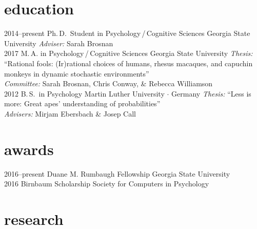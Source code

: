 \documentclass[]{friggeri-cv}
\begin{document}
\section{education}

\begin{entrylist}
  \entry
    {2014--present}
    {Ph.\,D.~Student in Psychology\,/\,Cognitive Sciences}
    {Georgia State University}
    {\emph{Adviser:} Sarah Brosnan\\[-.3cm]}
 \entry
   {2017}
   {M.\,A. in Psychology\,/\,Cognitive Sciences}
   {Georgia State University}
   {\emph{Thesis:} ``Rational fools: (Ir)rational choices of humans, rhesus macaques, and capuchin monkeys in dynamic stochastic environments''\\
   \emph{Committee:} Sarah Brosnan, Chris Conway, \& Rebecca Williamson\\[-.3cm]}
  \entry
    {2012}
    {B.\,S.~in Psychology}
    {Martin Luther University $\cdot$ Germany}
    {\emph{Thesis:} ``Less is more: Great apes' understanding of probabilities''\\
    \emph{Advisers:} Mirjam Ebersbach \& Josep Call}
\end{entrylist}


\section{awards}

\begin{entrylist}
  \entry
    {2016--present}
    {Duane M. Rumbaugh Fellowship}
    {Georgia State University}
    {\\[-.7cm]}
  \entry
    {2016}
    {Birnbaum Scholarship}
    {Society for Computers in Psychology}
    {}
\end{entrylist}

\section{research}
\end{document}
